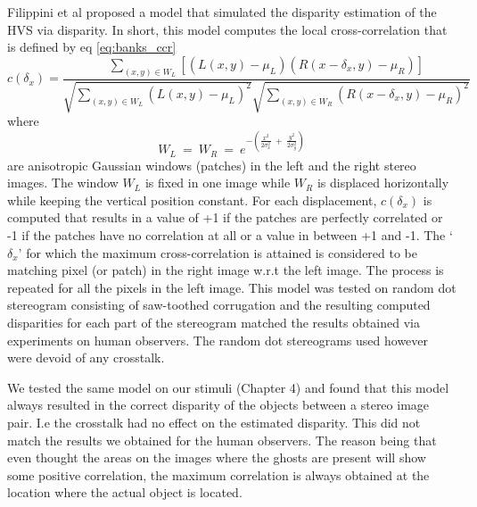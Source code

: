 Filippini et al \cite{filippini2009limits} proposed a model that simulated the disparity estimation of the HVS via disparity. In short, this model computes the local cross-correlation that is defined by eq \ref{eq:banks_ccr}
\begin{equation}
c(\delta_x) = \frac{ \sum\limits_{(x,y) \in W_L} [(L(x,y) - \mu_L)(R(x-\delta_x, y) - \mu_R)] }{\sqrt{\sum\limits_{(x,y) \in W_L}(L(x,y) - \mu_L)^2} \sqrt{\sum\limits_{(x,y) \in W_R}(R(x-\delta_x, y)- \mu_R)^2}}
\label{eq:banks_ccr}
\end{equation}
where
\begin{equation}
W_L \:=\: W_R \:=\: e^{-\left(\frac{x^2}{2\sigma_x^2} \:+\: \frac{y^2}{2\sigma_y^2}\right)}
\label{ccr_windows}
\end{equation}
are anisotropic Gaussian windows (patches) in the left and the right stereo images. The window $W_L$ is fixed in one image while $W_R$ is displaced horizontally while keeping the vertical position constant. For each displacement, $c(\delta_x)$ is computed that results in a value of +1 if the patches are perfectly correlated or -1 if the patches have no correlation at all or a value in between +1 and -1. The `$\delta_x$' for which the maximum cross-correlation is attained is considered to be matching pixel (or patch) in the right image w.r.t the left image. The process is repeated for all the pixels in the left image. This model was tested on random dot stereogram consisting of saw-toothed corrugation and the resulting computed disparities for each part of the stereogram matched the results obtained via experiments on human observers. The random dot stereograms used however were devoid of any crosstalk.

We tested the same model on our stimuli (Chapter 4) and found that this model always resulted in the correct disparity of the objects between a stereo image pair. I.e the crosstalk had no effect on the estimated disparity. This did not match the results we obtained for the human observers. The reason being that even thought the areas on the images where the ghosts are present will show some positive correlation, the maximum correlation is always obtained at the location where the actual object is located.

